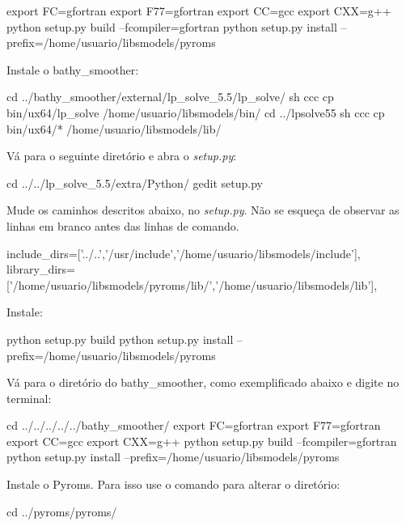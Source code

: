 \begin{bashcode}
export FC=gfortran
export F77=gfortran
export CC=gcc
export CXX=g++
python setup.py build --fcompiler=gfortran
python setup.py install --prefix=/home/usuario/libsmodels/pyroms
\end{bashcode}
\bigskip

\noindent Instale o bathy\_smoother:
\bigskip

\begin{bashcode}
cd ../bathy_smoother/external/lp_solve_5.5/lp_solve/
sh ccc
cp bin/ux64/lp_solve /home/usuario/libsmodels/bin/
cd ../lpsolve55
sh ccc
cp bin/ux64/* /home/usuario/libsmodels/lib/
\end{bashcode}
\bigskip

\noindent Vá para o seguinte diretório e abra o \textit{setup.py}:

\begin{bashcode}
 cd ../../lp_solve_5.5/extra/Python/
 gedit setup.py
\end{bashcode}
\bigskip

\noindent Mude os caminhos descritos abaixo, no \textit{setup.py}. Não se esqueça de observar as linhas em branco antes das linhas de comando.
\bigskip

\begin{bashcode}[fontsize=\scriptsize]
include_dirs=['../..','/usr/include','/home/usuario/libsmodels/include'],
library_dirs=['/home/usuario/libsmodels/pyroms/lib/','/home/usuario/libsmodels/lib'],
\end{bashcode}
\bigskip

\noindent Instale:
\bigskip

\begin{bashcode}
python setup.py build
python setup.py install --prefix=/home/usuario/libsmodels/pyroms
\end{bashcode}
\bigskip

\noindent Vá para o diretório do bathy\_smoother, como exemplificado abaixo e digite no terminal:
\bigskip

\begin{bashcode}
cd ../../../../../bathy_smoother/
export FC=gfortran
export F77=gfortran
export CC=gcc
export CXX=g++
python setup.py build --fcompiler=gfortran
python setup.py install --prefix=/home/usuario/libsmodels/pyroms
\end{bashcode}
\bigskip

\noindent Instale o Pyroms. Para isso use o comando para alterar o diretório:
\bigskip

\begin{bashcode}
cd ../pyroms/pyroms/
\end{bashcode}
\bigskip

